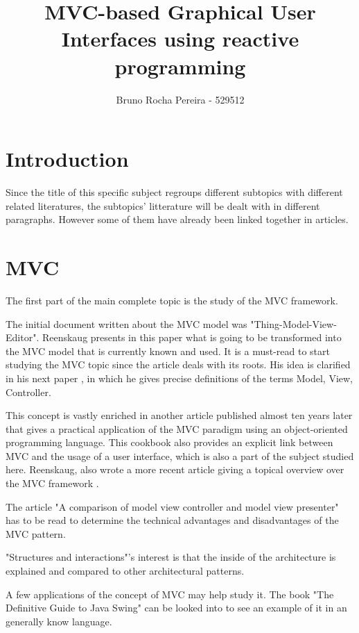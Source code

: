 \documentclass[a4paper]{scrartcl}
\title{MVC-based Graphical User Interfaces using reactive programming}
\author{Bruno Rocha Pereira - 529512}
\begin{document}
\maketitle

\section{Introduction}

Since the title of this specific subject regroups different subtopics with different related literatures, the subtopics' litterature will be dealt with in different paragraphs. However some of them have already been linked together in articles.

\section{MVC}

The first part of the main complete topic is the study of the MVC framework.

The initial document written about the MVC model was "Thing-Model-View-Editor"\cite{reenskaug1979athing}. Reenskaug presents in this paper what is going to be transformed into the MVC model that is currently known and used. It is a must-read to start studying the MVC topic since the article deals with its roots. His idea is clarified in his next paper \cite{reenskaug1979models}, in which he gives precise definitions of the terms Model, View, Controller. 

This concept is vastly enriched in another article published almost ten years later\cite{cookbookMVC} that gives a practical application of the MVC paradigm using an object-oriented programming language. This cookbook also provides an explicit link between MVC and the usage of a user interface, which is also a part of the subject studied here. Reenskaug, also wrote a more recent article giving a topical overview over the MVC framework \cite{MVCPastPresent}.

 The article "A comparison of model view controller and model view presenter" \cite{MVCvsMVP} has to be read to determine the technical advantages and disadvantages of the MVC pattern.


"Structures and interactions"'s interest\cite{nowack1999structures} is that the inside of the architecture is explained and compared to other architectural patterns.


A few applications of the concept of MVC may help study it. The book "The Definitive Guide to Java Swing" \cite{SwingMVC} can be looked into to see an example of it in an generally know language.
\end{document}

